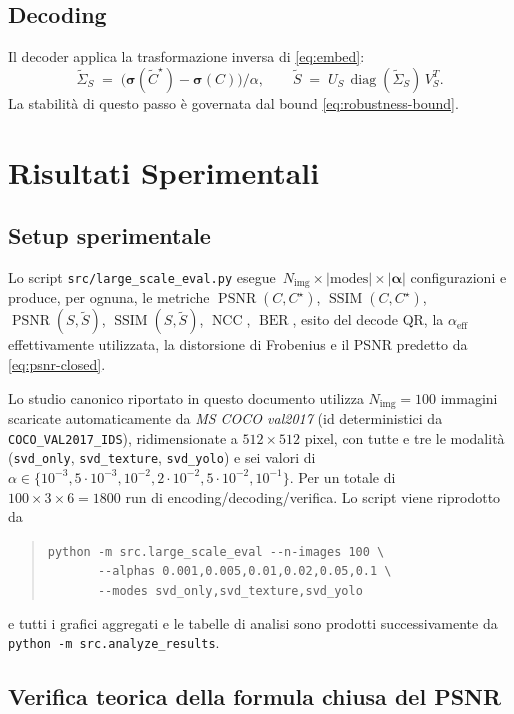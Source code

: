 \documentclass[11pt,a4paper]{article}
\theoremstyle{definition}
\theoremstyle{remark}
\DeclareMathOperator{\diag}{diag}
\DeclareMathOperator{\PSNR}{PSNR}
\DeclareMathOperator{\SSIM}{SSIM}
\DeclareMathOperator{\NCC}{NCC}
\DeclareMathOperator{\BER}{BER}
\begin{document}
\subsection{Decoding}
Il decoder applica la trasformazione inversa di \eqref{eq:embed}:
\[
   \widetilde\Sigma_S \;=\;
   \bigl(\boldsymbol\sigma(\widetilde C^{\star}) - \boldsymbol\sigma(C)\bigr)/\alpha,
   \qquad
   \widetilde S \;=\; U_S\,\diag(\widetilde\Sigma_S)\,V_S^T.
\]
La stabilità di questo passo è governata dal bound
\eqref{eq:robustness-bound}.


\section{Risultati Sperimentali}
\label{sec:results}

\subsection{Setup sperimentale}

Lo script \verb|src/large_scale_eval.py| esegue
$\,N_{\text{img}} \times |\text{modes}| \times |\boldsymbol{\alpha}|$
configurazioni e produce, per ognuna, le metriche
$\PSNR(C,C^{\star})$, $\SSIM(C,C^{\star})$, $\PSNR(S,\widetilde S)$,
$\SSIM(S,\widetilde S)$, $\NCC$, $\BER$, esito del decode QR,
la $\alpha_{\text{eff}}$ effettivamente utilizzata, la distorsione di
Frobenius e il PSNR predetto da \eqref{eq:psnr-closed}.

Lo studio canonico riportato in questo documento utilizza
$N_{\text{img}} = 100$ immagini scaricate automaticamente da
\emph{MS COCO val2017} (id deterministici da \verb|COCO_VAL2017_IDS|),
ridimensionate a $512\times 512$ pixel, con tutte e tre le modalit\`a
(\verb|svd_only|, \verb|svd_texture|, \verb|svd_yolo|) e sei valori
di $\alpha\in\{10^{-3}, 5\!\cdot\!10^{-3}, 10^{-2}, 2\!\cdot\!10^{-2}, 5\!\cdot\!10^{-2}, 10^{-1}\}$.
Per un totale di $100 \times 3 \times 6 = 1800$ run di
encoding/decoding/verifica.
Lo script viene riprodotto da
\begin{quote}\small
\verb|python -m src.large_scale_eval --n-images 100 \|\\
\verb|       --alphas 0.001,0.005,0.01,0.02,0.05,0.1 \|\\
\verb|       --modes svd_only,svd_texture,svd_yolo|
\end{quote}
\noindent
e tutti i grafici aggregati e le tabelle di analisi sono prodotti
successivamente da \verb|python -m src.analyze_results|.

\subsection{Verifica teorica della formula chiusa del PSNR}
\label{sec:theory-verif}
\end{document}

